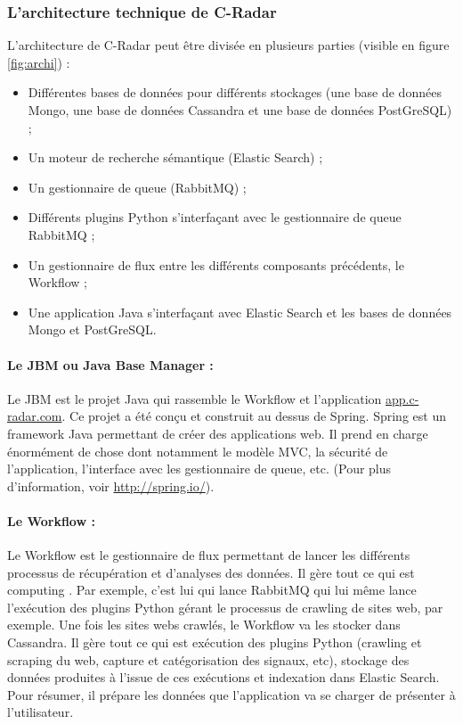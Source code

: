         \subsubsection{L'architecture technique de C-Radar}
            L'architecture de C-Radar peut être divisée en plusieurs parties (visible en figure \ref{fig:archi}) :
            \begin{itemize}
                \item Différentes bases de données pour différents stockages (une base de données Mongo, une base de données Cassandra et une base de données PostGreSQL) ;
                \item Un moteur de recherche sémantique (Elastic Search) ;
                \item Un gestionnaire de queue (RabbitMQ) ;
                \item Différents plugins Python s'interfaçant avec le gestionnaire de queue RabbitMQ ;
                \item Un gestionnaire de flux entre les différents composants précédents, le Workflow ;
                \item Une application Java s'interfaçant avec Elastic Search et les bases de données Mongo et PostGreSQL.
            \end{itemize}

            \paragraph{Le JBM ou Java Base Manager :}
                Le JBM est le projet Java qui rassemble le Workflow et l'application \href{app.c-radar.com}{app.c-radar.com}. Ce projet a été conçu et construit au dessus de Spring. Spring est un framework Java permettant de créer des applications web. Il prend en charge énormément de chose dont notamment le modèle MVC, la sécurité de l'application, l'interface avec les gestionnaire de queue, etc. (Pour plus d'information, voir \href{http://spring.io/}{http://spring.io/}).

            \paragraph{Le Workflow :}
                Le Workflow est le gestionnaire de flux permettant de lancer les différents processus de récupération et d'analyses des données. Il gère tout ce qui est \og computing \fg. Par exemple, c'est lui qui lance RabbitMQ qui lui même lance l'exécution des plugins Python gérant le processus de crawling de sites web, par exemple. Une fois les sites webs crawlés, le Workflow va les stocker dans Cassandra. Il gère tout ce qui est exécution des plugins Python (crawling et scraping du web, capture et catégorisation des signaux, etc), stockage des données produites à l'issue de ces exécutions et indexation dans Elastic Search.\\
                Pour résumer, il prépare les données que l'application va se charger de présenter à l'utilisateur.

